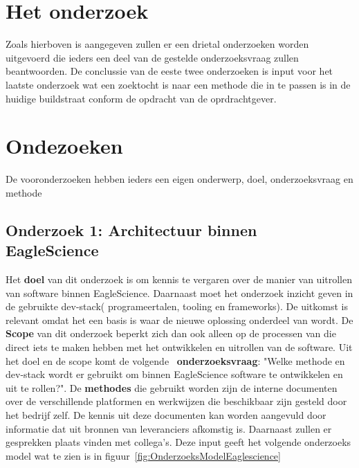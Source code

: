 \section{Het onderzoek}\label{sec:methodeonderzoek}
Zoals hierboven is aangegeven zullen er een drietal onderzoeken worden uitgevoerd die ieders een deel van de gestelde onderzoeksvraag zullen beantwoorden. De conclussie van de eeste twee onderzoeken is input voor het laatste onderzoek wat een zoektocht is naar een methode die in te passen is in de huidige buildstraat conform de opdracht van de oprdrachtgever.
\section{Ondezoeken}\label{sec:onderzoeken}
De vooronderzoeken hebben ieders een eigen onderwerp, doel, onderzoeksvraag en methode
\subsection{Onderzoek 1: Architectuur binnen EagleScience}\label{subsec:onderzoeksmethode-architectuur-binnen-eaglescience}
Het \textbf{doel} van dit onderzoek is om kennis te vergaren over de manier van uitrollen van software binnen EagleScience. Daarnaast moet het onderzoek inzicht geven in de gebruikte dev-stack( programeertalen, tooling en frameworks). De uitkomst is relevant omdat het een basis is waar de nieuwe oplossing onderdeel van wordt. De \textbf{Scope} van dit onderzoek beperkt zich dan ook alleen op de processen van die direct iets te maken hebben met het ontwikkelen en uitrollen van de software. Uit het doel en de scope komt de volgende ~\textbf{onderzoeksvraag}: "Welke methode en dev-stack wordt er gebruikt om binnen EagleScience software te ontwikkelen en uit te rollen?". De \textbf{methodes} die gebruikt worden zijn de interne documenten over de verschillende platformen en werkwijzen die beschikbaar zijn gesteld door het bedrijf zelf. De kennis uit deze documenten kan worden aangevuld door informatie dat uit bronnen van leveranciers afkomstig is. Daarnaast zullen er gesprekken plaats vinden met collega's. Deze input geeft het volgende onderzoeks model wat te zien is in figuur~\ref{fig:OnderzoeksModelEaglescience}


